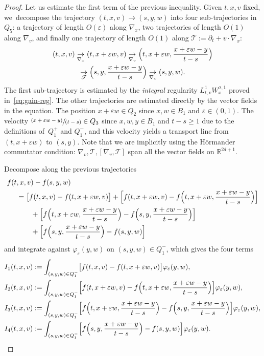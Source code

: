 \documentclass[11pt]{article}
\numberwithin{equation}{section}\let\oldbigcup\bigcup
\let\mathcal\mathscr
\newcommand{\pspfrac}[2]{\sfrac{(#1)}{(#2)}}
\theoremstyle{definition}
\theoremstyle{remark}
\newcommand\R{{\mathbb R}}
\newcommand{\cT}{\mathcal T}
\let\var\varepsilon
\begin{document}
\begin{proof}
Let us estimate the first term of the previous
inequality. Given $t,x,v$ fixed, we~decompose the trajectory
$(t,x,v)\to (s,y,w)$ into four sub-trajectories in
$Q_5$: a trajectory of length $O(\var)$ along $\nabla_x$, two
trajectories of length $O(1)$ along $\nabla_v$, and finally one
trajectory of length $O(1)$ along
$\cT := \partial_t + v \cdot \nabla_x$:
\begin{multline*}
(t,x,v)\underset{\nabla_x}{\to}
(t,x+\varepsilon w,v) \underset{\nabla_v}{\to}
\Bigl(t,x+\varepsilon w, \frac{x+\varepsilon w
-y}{t-s} \Bigr) \\
\underset{\cT}{\to} \Bigl(s,
y,\frac{x+\varepsilon w -y}{t-s} \Bigr)
\underset{\nabla_v}{\to} (s,y,w).
\end{multline*}
The first sub-trajectory is estimated by the {\it integral}
regularity $L^1_{t,v} W^{\sigma,1}_{x}$ proved
in~\eqref{eq:gain-reg}. The other trajectories are estimated
directly by the vector fields in the equation. The position
$x+\varepsilon w \in Q_2$ since $x,w \in B_1$ and
$\var \in (0,1)$. The velocity
$\pspfrac{x+\varepsilon w -y}{t-s} \in Q_3$ since $x,w,y \in B_1$
and $t-s\geq 1$ due to the definitions of~$Q_{1}^+$ and
$Q_{1}^{-}$, and this velocity yields a transport line from
$(t,x+\varepsilon w)$ to $(s,y)$. Note that we are implicitly
using the Hörmander commutator condition:
$\nabla_v,\cT, [\nabla_v,\cT]$ span all the vector fields on
$\R^{2d+1}$.

Decompose along the previous trajectories
\begin{align*}
f(t&,x,v)-f(s,y,w) \\
& = \bigl[ f(t,x,v)-f(t,x+\varepsilon w,v) \bigr] +
\Bigl[ f(t,x+\varepsilon
w,v)- f \Bigl(t,x+\varepsilon w,\frac{x+\varepsilon w -y}{t-s}
\Bigr) \Bigr] \\
& \qquad + \Bigl[ f \Bigl(t,x+\varepsilon w,\frac{x+\varepsilon w
-y}{t-s} \Bigr)- f \Bigl(s,y,\frac{x+\varepsilon w
-y}{t-s} \Bigr) \Bigr] \\
& \qquad + \Bigl[ f \Bigl(s,y,\frac{x+\varepsilon w
-y}{t-s} \Bigr)-f(s,y,w) \Bigr]
\end{align*}
and integrate against $\varphi_\var(y,w)$ on
$(s,y,w)\in Q_{1}^-$, which gives the four terms
\begin{align*}
I_1(t,x,v)
& := \int_{(s,y,w)\in Q_1^{-}}
\bigl[ f(t,x,v)-f(t,x+\varepsilon
w,v)\bigr] \varphi_\var(y,w),\\
I_2(t,x,v)
& := \int_{(s,y,w)\in Q_1^{-}}
\Bigl[ f(t,x+\varepsilon w,v)-f\Bigl(t,x+\varepsilon
w,\frac{x+\varepsilon w -y}{t-s}\Bigr)\Bigr]
\varphi_\var(y,w), \\
I_3(t,x,v)
& := \int_{(s,y,w)\in Q_1^{-}} \Bigl[ f\Bigl(t,x+\varepsilon
w,\frac{x+\varepsilon w
-y}{t-s}\Bigr)-f\Bigl(s,y,\frac{x+\varepsilon w
-y}{t-s}\Bigr)\Bigr] \varphi_\var(y,w), \\
I_4(t,x,v)
& := \int_{(s,y,w)\in Q_1^{-}}
\Bigl[ f\Bigl(s,y,\frac{x+\varepsilon w
-y}{t-s}\Bigr)-f(s,y,w)\Bigr] \varphi_\var(y,w).
\end{align*}


\end{proof}
\end{document}
